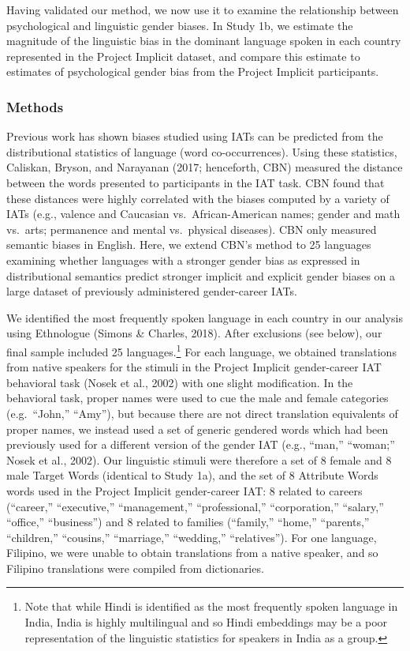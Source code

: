 \documentclass[man,floatsintext]{apa6}
\let\rmarkdownfootnote\footnote%
\def\footnote{\protect\rmarkdownfootnote}
\begin{document}
Having validated our method, we now use it to examine the relationship between psychological and linguistic gender biases. In Study 1b, we estimate the magnitude of the linguistic bias in the dominant language spoken in each country represented in the Project Implicit dataset, and compare this estimate to estimates of psychological gender bias from the Project Implicit participants.

\hypertarget{methods-1}{%
\subsubsection{Methods}\label{methods-1}}

Previous work has shown biases studied using IATs can be predicted from the distributional statistics of language (word co-occurrences). Using these statistics, Caliskan, Bryson, and Narayanan (2017; henceforth, CBN) measured the distance between the words presented to participants in the IAT task. CBN found that these distances were highly correlated with the biases computed by a variety of IATs (e.g., valence and Caucasian vs.~African-American names; gender and math vs.~arts; permanence and mental vs.~physical diseases). CBN only measured semantic biases in English. Here, we extend CBN's method to 25 languages examining whether languages with a stronger gender bias as expressed in distributional semantics predict stronger implicit and explicit gender biases on a large dataset of previously administered gender-career IATs.

We identified the most frequently spoken language in each country in our analysis using Ethnologue (Simons \& Charles, 2018). After exclusions (see below), our final sample included 25 languages.\footnote{Note that while Hindi is identified as the most frequently spoken language in India, India is highly multilingual and so Hindi embeddings may be a poor representation of  the linguistic statistics for speakers in India as a group.} For each language, we obtained translations from native speakers for the stimuli in the Project Implicit gender-career IAT behavioral task (Nosek et al., 2002) with one slight modification. In the behavioral task, proper names were used to cue the male and female categories (e.g.~\enquote{John,} \enquote{Amy}), but because there are not direct translation equivalents of proper names, we instead used a set of generic gendered words which had been previously used for a different version of the gender IAT (e.g., ``man,'' ``woman;'' Nosek et al., 2002). Our linguistic stimuli were therefore a set of 8 female and 8 male Target Words (identical to Study 1a), and the set of 8 Attribute Words words used in the Project Implicit gender-career IAT: 8 related to careers (\enquote{career,} \enquote{executive,} \enquote{management,} \enquote{professional,} \enquote{corporation,} \enquote{salary,} \enquote{office,} \enquote{business}) and 8 related to families (\enquote{family,} \enquote{home,} \enquote{parents,} \enquote{children,} \enquote{cousins,} \enquote{marriage,} \enquote{wedding,} \enquote{relatives}). For one language, Filipino, we were unable to obtain translations from a native speaker, and so Filipino translations were compiled from dictionaries.
\end{document}
